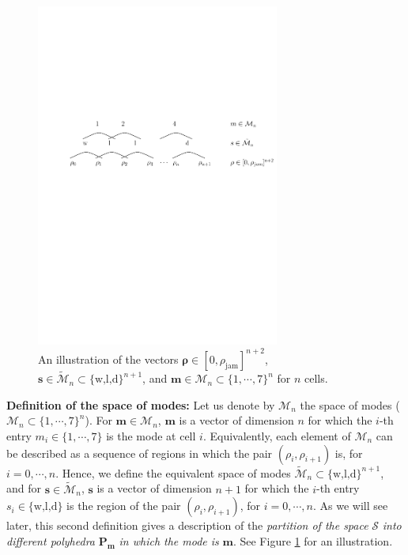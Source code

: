 \begin{figure}[ht]
  \centering
    \includegraphics[width=8cm]{figures/modes.pdf}
    \caption{An illustration of the vectors $\boldsymbol \rho\in[0,\rho_{\text{jam}}]^{n+2}$, $\boldsymbol s\in\tilde{\mathcal{M}}_{n}\subset\{\text{w,l,d}\}^{n+1}$, and $\boldsymbol m\in\mathcal{M}_{n}\subset\{1,\cdots,7\}^{n}$ for $n$ cells.}
    \label{fig:modes}
\end{figure}

\noindent\textbf{Definition of the space of modes:} Let us denote by $\mathcal{M}_{n}$ the space of modes ($\mathcal{M}_{n}\subset\{1,\cdots,7\}^{n}$). For $\boldsymbol m \in \mathcal{M}_{n}$, $\boldsymbol m$ is a vector of dimension $n$ for which the $i$-th entry $m_{i}\in\{1,\cdots,7\}$ is the mode at cell $i$. Equivalently, each element of $\mathcal{M}_{n}$ can be described as a sequence of regions in which the pair $(\rho_{i},\rho_{i+1})$ is, for $i=0,\cdots,n$. Hence, we define the equivalent space of modes $\tilde{\mathcal{M}}_{n}\subset\{\text{w,l,d}\}^{n+1}$, and for $\boldsymbol s \in \tilde{\mathcal{M}}_{n}$, $\boldsymbol s$ is a vector of dimension $n+1$ for which the $i$-th entry $s_{i}\in\{\text{w,l,d}\}$ is the region of the pair $(\rho_{i},\rho_{i+1})$, for $i=0,\cdots,n$. As we will see later, this second definition gives a description of the \emph{partition of the space} $\mathcal{S}$ \emph{into different polyhedra} $\textbf{P}_{\boldsymbol m}$ \emph{in which the mode is} $\boldsymbol m$. See Figure \ref{fig:modes} for an illustration.

